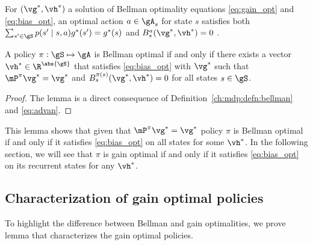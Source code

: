 For $(\vg^*,\vh^*)$ a solution of Bellman optimality equations \eqref{eq:gain_opt} and \eqref{eq:bias_opt}, %
an optimal action $a\in\gA_s$ for state $s$ satisfies both ${\sum_{s'\in\gS}p(s'\mid s,a)g^*(s')} =g^*(s)$ and $B^a_s(\vg^*,\vh^*)=0$ \cite{puterman2014markov, schweitzer1978functional}.

\begin{lem}
    \label{ch:mdp:lem:bellman_charac}
    A policy $\pi:\gS\mapsto\gA$ is Bellman optimal if and only if there exists a vector $\vh^*\in\R^{\abs{\gS}}$ that satisfies \eqref{eq:bias_opt} with $\vg^*$ such that $\mP^\pi\vg^*=\vg^*$ and $B^{\pi(s)}_s(\vg^*,\vh^*)=0$ for all states $s\in\gS$.
\end{lem}
\begin{proof}
    The lemma is a direct consequence of Definition~\ref{ch:mdp:defn:bellman} and \eqref{eq:advan}.
\end{proof}
This lemma shows that given that $\mP^\pi\vg^*=\vg^*$ policy $\pi$ is Bellman optimal if and only if it satisfies \eqref{eq:bias_opt} on all states for some $\vh^*$.
In the following section, we will see that $\pi$ is gain optimal if and only if it satisfies \eqref{eq:bias_opt} on its recurrent states for any $\vh^*$.

\subsection{Characterization of gain optimal policies}
\label{ssec:gain_charac}
To highlight the difference between Bellman and gain optimalities, we prove lemma that characterizes the gain optimal policies.

